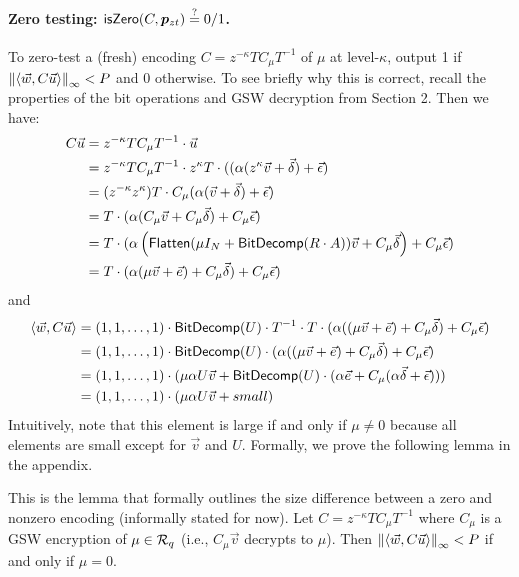 \paragraph{Zero testing:  $\mathsf{isZero}(C, \bm{p}_{zt}) \stackrel{?}{=} 0/1$.}  To zero-test a (fresh) encoding $C = z^{-\kappa} T C_\mu T^{-1}$ of $\mu$ at level-$\kappa$, output 1 if $\left\lVert\left<\vec{w}, C\vec{u}\right>\right\rVert_\infty < P$ and 0 otherwise.  To see briefly why this is correct, recall the properties of the bit operations and GSW decryption from Section 2.  Then we have:
\begin{align*}
C\vec{u} &= z^{-\kappa} T C_\mu T^{-1} \cdot \vec{u}\\
&= z^{-\kappa} T C_\mu  T^{-1} \cdot z^\kappa T\cdot ((\alpha(z^\kappa\vec{v} + \vec{\delta}) + \vec{\epsilon})\\
&= (z^{-\kappa} z^{\kappa}) T \cdot C_\mu (\alpha(\vec{v} + \vec{\delta}) + \vec{\epsilon})\\
&= T \cdot (\alpha(C_\mu\vec{v} + C_\mu\vec{\delta}) + C_\mu\vec{\epsilon})\\
&= T \cdot (\alpha\left(\mathsf{Flatten}(\mu I_{N} + \mathsf{BitDecomp}(R\cdot A))\vec{v} + C_\mu\vec{\delta}\right) + C_\mu\vec{\epsilon})\\
&= T \cdot (\alpha(\mu \vec{v} + \vec{e}) + C_\mu\vec{\delta}) + C_\mu\vec{\epsilon})
\end{align*}
and
\begin{align*}
\left<\vec{w}, C\vec{u}\right> &= (1,1,\ldots,1)\cdot\mathsf{BitDecomp}(U)\cdot T^{-1}\cdot T \cdot (\alpha((\mu \vec{v} + \vec{e}) + C_\mu\vec{\delta}) + C_\mu\vec{\epsilon})\\
&= (1,1,\ldots,1)\cdot\mathsf{BitDecomp}(U) \cdot (\alpha((\mu \vec{v} + \vec{e}) + C_\mu\vec{\delta}) + C_\mu\vec{\epsilon})\\
&= (1,1,\ldots,1)\cdot(\mu\alpha U \vec{v} + \mathsf{BitDecomp}(U)\cdot (\alpha\vec{e} + C_\mu(\alpha\vec{\delta} + \vec{\epsilon})))\\
&= (1,1,\ldots,1)\cdot(\mu\alpha U \vec{v} + small)
\end{align*} 
Intuitively, note that this element is large if and only if $\mu \not= 0$ because all elements are small except for $\vec{v}$ and $U$.  Formally, we prove the following lemma in the appendix.

\begin{lemma}
\label{zerotesting}
This is the lemma that formally outlines the size difference between a zero and nonzero encoding (informally stated for now).  Let $C = z^{-\kappa} TC_\mu T^{-1}$ where $C_\mu$ is a GSW encryption of $\mu \in \mathcal{R}_q$ (i.e., $C_\mu\vec{v}$ decrypts to $\mu$).  Then $\left\lVert\left<\vec{w}, C\vec{u}\right>\right\rVert_\infty < P$ if and only if $\mu = 0$.
\end{lemma}

